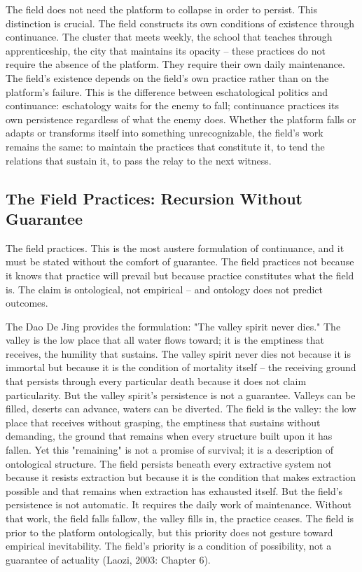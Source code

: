 The field does not need the platform to collapse in order to persist. This distinction is crucial. The field constructs its own conditions of existence through continuance. The cluster that meets weekly, the school that teaches through apprenticeship, the city that maintains its opacity -- these practices do not require the absence of the platform. They require their own daily maintenance. The field's existence depends on the field's own practice rather than on the platform's failure. This is the difference between eschatological politics and continuance: eschatology waits for the enemy to fall; continuance practices its own persistence regardless of what the enemy does. Whether the platform falls or adapts or transforms itself into something unrecognizable, the field's work remains the same: to maintain the practices that constitute it, to tend the relations that sustain it, to pass the relay to the next witness.

\subsection{The Field Practices: Recursion Without Guarantee}

The field practices. This is the most austere formulation of continuance, and it must be stated without the comfort of guarantee. The field practices not because it knows that practice will prevail but because practice constitutes what the field is. The claim is ontological, not empirical -- and ontology does not predict outcomes.

The Dao De Jing provides the formulation: "The valley spirit never dies." The valley is the low place that all water flows toward; it is the emptiness that receives, the humility that sustains. The valley spirit never dies not because it is immortal but because it is the condition of mortality itself -- the receiving ground that persists through every particular death because it does not claim particularity. But the valley spirit's persistence is not a guarantee. Valleys can be filled, deserts can advance, waters can be diverted. The field is the valley: the low place that receives without grasping, the emptiness that sustains without demanding, the ground that remains when every structure built upon it has fallen. Yet this "remaining" is not a promise of survival; it is a description of ontological structure. The field persists beneath every extractive system not because it resists extraction but because it is the condition that makes extraction possible and that remains when extraction has exhausted itself. But the field's persistence is not automatic. It requires the daily work of maintenance. Without that work, the field falls fallow, the valley fills in, the practice ceases. The field is prior to the platform ontologically, but this priority does not gesture toward empirical inevitability. The field's priority is a condition of possibility, not a guarantee of actuality (Laozi, 2003: Chapter 6).


